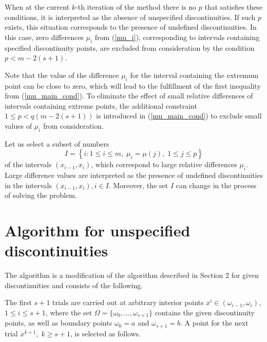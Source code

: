 \documentclass[runningheads]{llncs}
\begin{document}
When at the current $k$-th iteration of the method there is no $p$ that satisfies these conditions, it is interpreted as the absence of unspecified discontinuities. If such $p$ exists, this situation corresponds to the presence of undefined discontinuities. In this case, zero differences $\mu_i$ from (\ref{mu_i}), corresponding to intervals containing specified discontinuity points, are excluded from consideration by the condition $p<m-2(s+1)$.

Note that the value of the difference $\mu_i$ for the interval containing the extremum point can be close to zero, which will lead to the fulfillment of the first inequality from (\ref{mu_main_cond}). To eliminate the effect of small relative differences of intervals containing extreme points, the additional constraint $1 \leq p < q(m-2(s+1))$ is introduced in (\ref{mu_main_cond}) to exclude small values of $\mu_i$ from consideration.

Let us select a subset of numbers
\begin{equation}\label{set_I}
I=\left\{ i:1 \leq i \leq m, \; \mu_i=\mu(j), \; 1 \leq j \leq p\right\}
\end{equation}
of the intervals $(x_{i-1},x_i)$, which correspond to large relative differences $\mu_i$. Large difference values are interpreted as the presence of undefined discontinuities in the intervals $(x_{i-1},x_i), i \in I$. Moreover, the set $I$ can change in the process of solving the problem.

\section{Algorithm for unspecified discontinuities}

The algorithm is a modification of the algorithm described in Section 2 for given discontinuities and consists of the following. 

The first $s+1$ trials are carried out at arbitrary interior points $x^i \in (\omega_{i-1},\omega_i )$,  $1 \leq i \leq s+1$, where the set $\Omega=\{\omega_0,...,\omega_{s+1}\}$ contains the given discontinuity points, as well as boundary points $\omega_0=a$ and $\omega_{s+1}=b$. A point for the next trial $x^{k+1}, \; k \geq s+1$, is selected as follows.
\end{document}
